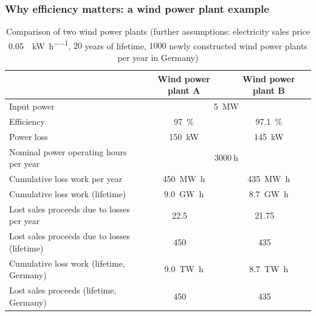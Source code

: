 \begin{frame}[c]
	\frametitle{Why efficiency matters: a wind power plant example}
	\begin{table}
		\centering
		\begin{tabular}{lcc}
			\toprule
			                                             & Wind power plant A                            & Wind power plant B               \\
			\midrule
			Input power                                  & \multicolumn{2}{c}{\SI{5}{\mega\watt}} \pause                                    \\
			Efficiency                                   & \SI{97}{\percent}                             & \SI{97.1}{\percent}  \pause      \\
			Power loss                                   & \SI{150}{\kilo\watt}                          & \SI{145}{\kilo\watt}\pause       \\
			\midrule
			Nominal power operating hours per year       & \multicolumn{2}{c}{$\SI{3000}{\hour}$} \pause                                    \\
			Cumulative loss work per year                & \SI{450}{\mega\watt\hour}                     & \SI{435}{\mega\watt\hour} \pause \\
			Cumulative loss work (lifetime)              & \SI{9.0}{\giga\watt\hour}                     & \SI{8.7}{\giga\watt\hour} \pause \\
			\midrule
			Lost sales proceeds due to losses per year   & \SI{22.5}{\kilo\EUR}                          & \SI{21.75}{\kilo\EUR} \pause     \\
			Lost sales proceeds due to losses (lifetime) & \SI{450}{\kilo\EUR}                           & \SI{435}{\kilo\EUR} \pause       \\
			\midrule
			Cumulative loss work (lifetime, Germany)     & \SI{9.0}{\tera\watt\hour}                     & \SI{8.7}{\tera\watt\hour} \pause \\
			Lost sales proceeds (lifetime, Germany)      & \SI{450}{\mega\EUR}                           & \SI{435}{\mega\EUR}              \\
			\bottomrule
		\end{tabular}
		\label{tab:efficiency_wind_power_example}
		\caption{Comparison of two wind power plants (further assumptions:  electricity sales price \SI[fraction-function=\nicefrac]{0.05}{\EUR\per\kilo\watt\per\hour}, $20$ years of lifetime, $\num{1000}$ newly constructed wind power plants per year in Germany)}
	\end{table}
\end{frame}

